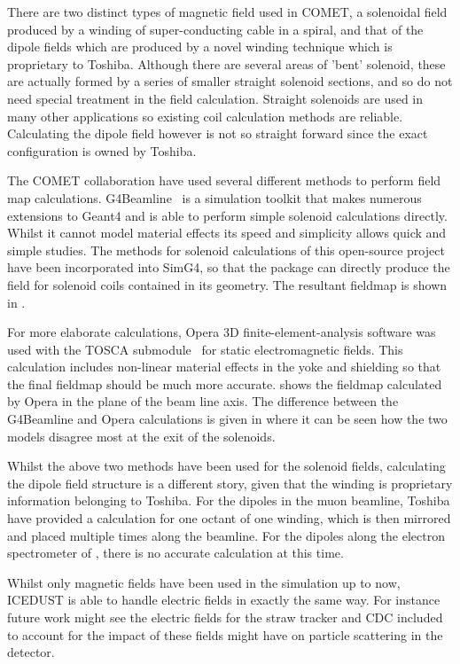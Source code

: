 There are two distinct types of magnetic field used in COMET, a solenoidal field produced by a winding of super-conducting cable in a spiral, and that of the dipole fields which are produced by a novel winding technique which
is proprietary to Toshiba.  
Although there are several areas of 'bent' solenoid, these are actually formed by a series of smaller straight solenoid sections, and so do not need special treatment in the field calculation.
Straight solenoids are used in many other applications so existing coil calculation methods are reliable. 
Calculating the dipole field however is not so straight forward since the exact configuration is owned by Toshiba.

The COMET collaboration have used several different methods to perform field map calculations.
G4Beamline~\cite{G4Beamline} is a simulation toolkit that makes numerous extensions to Geant4 and is able to perform simple solenoid calculations directly.
Whilst it cannot model material effects its speed and simplicity allows quick and simple studies. 
The methods for solenoid calculations of this open-source project have been incorporated into SimG4, so that the package can directly produce the field for solenoid coils contained in its geometry.
The resultant fieldmap is shown in .

For more elaborate calculations, Opera 3D finite-element-analysis software was used with the TOSCA submodule~\cite{Opera} for static electromagnetic fields.
This calculation includes non-linear material effects in the yoke and shielding so that the final fieldmap should be much more accurate.
 shows the fieldmap calculated by Opera in the plane of the beam line axis.
The difference between the G4Beamline and Opera calculations is given in  where it can be seen how the two models disagree most at the exit of the solenoids.

Whilst the above two methods have been used for the solenoid fields, calculating the dipole field structure is a different story, given that the winding is proprietary information belonging to Toshiba.
For the dipoles in the muon beamline, Toshiba have provided a calculation for one octant of one winding, which is then mirrored and placed multiple times along the beamline.
For the dipoles along the electron spectrometer of \phaseII, there is no accurate calculation at this time.

Whilst only magnetic fields have been used in the simulation up to now, ICEDUST is able to handle electric fields in exactly the same way.
For instance future work might see the electric fields for the straw tracker and CDC included to account for the impact of these fields might have on particle scattering in the detector.

